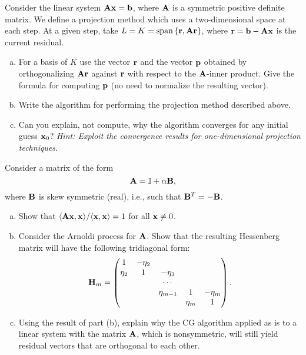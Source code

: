 \begin{Sheet}
	\begin{Problem}
        Consider the linear system $\mathbf A\mathbf x = \mathbf b$, where $\mathbf A$ is a
        symmetric positive definite matrix. We define a projection method
        which uses a two-dimensional space at each step. At a given step,
        take $L = K = \operatorname{span}\left\{\mathbf r, \mathbf A\mathbf r\right\}$, where $\mathbf r = \mathbf b - \mathbf A\mathbf x$
        is the current residual.
        \begin{enumerate}[(a)]
            \item For a basis of $K$ use the vector $\mathbf r$ and the vector $\mathbf p$
            obtained by orthogonalizing $\mathbf A\mathbf r$ against $\mathbf r$ with
            respect to the $\mathbf A$-inner product. Give the formula for
            computing $\mathbf p$ (no need to normalize the resulting vector).
            \item Write the algorithm for performing the projection method
            described above.
            \item Can you explain, not compute, why the algorithm converges for any initial guess $\mathbf x_0$?
            \textit{Hint: Exploit the convergence results for one-dimensional projection techniques.}
        \end{enumerate}
	\end{Problem}

    \begin{Problem}
        Consider a matrix of the form
         \[\mathbf A = \mathbb I + \alpha\mathbf B, \]
         where $\mathbf B$ is skew symmetric (real), i.e., such that $\mathbf B^T = -\mathbf B$.
         \begin{enumerate}[(a)]
             \item Show that $\langle\mathbf A\mathbf x,\mathbf x\rangle/\langle\mathbf x,\mathbf x\rangle = 1$ for all $\mathbf x \neq 0$.
             \item Consider the Arnoldi process for $\mathbf A$.
                 Show that the resulting Hessenberg matrix will have the following tridiagonal form:
                 \[ \mathbf H_m = \begin{pmatrix}
                     1 & -\eta_2 & & & \\
                     \eta_2 & 1 & -\eta_3 & & \\
                       &  & \cdots & & \\
                       &  & \eta_{m-1} & 1 & -\eta_m \\
                       &  &  & \eta_m & 1 
                 \end{pmatrix}.\]
             \item Using the result of part (b), explain why the CG algorithm applied as is to a linear system with  the matrix $\mathbf A$, which is nonsymmetric,
                 will still yield residual vectors that are orthogonal to each other.
         \end{enumerate}
    \end{Problem}


  \vfill
  
  

\end{Sheet}


